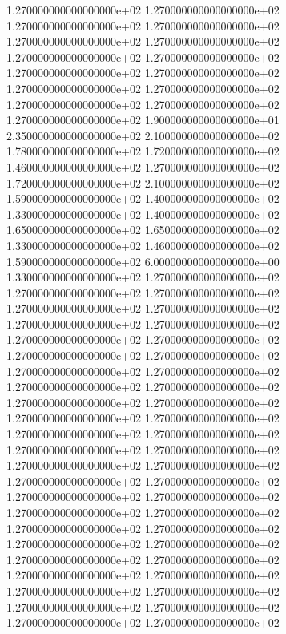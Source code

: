 1.270000000000000000e+02 1.270000000000000000e+02 1.270000000000000000e+02 1.270000000000000000e+02 1.270000000000000000e+02 1.270000000000000000e+02 1.270000000000000000e+02 1.270000000000000000e+02 1.270000000000000000e+02 1.270000000000000000e+02 1.270000000000000000e+02 1.270000000000000000e+02 1.270000000000000000e+02 1.270000000000000000e+02 1.270000000000000000e+02 1.900000000000000000e+01 2.350000000000000000e+02 2.100000000000000000e+02 1.780000000000000000e+02 1.720000000000000000e+02 1.460000000000000000e+02 1.270000000000000000e+02 1.720000000000000000e+02 2.100000000000000000e+02 1.590000000000000000e+02 1.400000000000000000e+02 1.330000000000000000e+02 1.400000000000000000e+02 1.650000000000000000e+02 1.650000000000000000e+02 1.330000000000000000e+02 1.460000000000000000e+02 1.590000000000000000e+02 6.000000000000000000e+00 1.330000000000000000e+02 1.270000000000000000e+02 1.270000000000000000e+02 1.270000000000000000e+02 1.270000000000000000e+02 1.270000000000000000e+02 1.270000000000000000e+02 1.270000000000000000e+02 1.270000000000000000e+02 1.270000000000000000e+02 1.270000000000000000e+02 1.270000000000000000e+02 1.270000000000000000e+02 1.270000000000000000e+02 1.270000000000000000e+02 1.270000000000000000e+02 1.270000000000000000e+02 1.270000000000000000e+02 1.270000000000000000e+02 1.270000000000000000e+02 1.270000000000000000e+02 1.270000000000000000e+02 1.270000000000000000e+02 1.270000000000000000e+02 1.270000000000000000e+02 1.270000000000000000e+02 1.270000000000000000e+02 1.270000000000000000e+02 1.270000000000000000e+02 1.270000000000000000e+02 1.270000000000000000e+02 1.270000000000000000e+02 1.270000000000000000e+02 1.270000000000000000e+02 1.270000000000000000e+02 1.270000000000000000e+02 1.270000000000000000e+02 1.270000000000000000e+02 1.270000000000000000e+02 1.270000000000000000e+02 1.270000000000000000e+02 1.270000000000000000e+02 1.270000000000000000e+02 1.270000000000000000e+02 1.270000000000000000e+02 1.270000000000000000e+02
